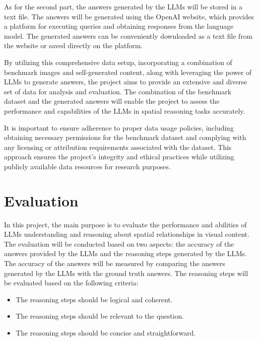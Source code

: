 \documentclass[journal,10pt]{IEEEtran}
\begin{document}
As for the second part, the answers generated by the LLMs will be stored in a text file. The answers will be generated using the OpenAI website, which provides a platform for executing queries and obtaining responses from the language model. The generated answers can be conveniently downloaded as a text file from the website or saved directly on the platform.

By utilizing this comprehensive data setup, incorporating a combination of benchmark images and self-generated content, along with leveraging the power of LLMs to generate answers, the project aims to provide an extensive and diverse set of data for analysis and evaluation. The combination of the benchmark dataset and the generated answers will enable the project to assess the performance and capabilities of the LLMs in spatial reasoning tasks accurately.

It is important to ensure adherence to proper data usage policies, including obtaining necessary permissions for the benchmark dataset and complying with any licensing or attribution requirements associated with the dataset. This approach ensures the project's integrity and ethical practices while utilizing publicly available data resources for research purposes.

\section{Evaluation}
In this project, the main purpose is to evaluate the performance and abilities of LLMs understanding and reasoning about spatial relationships in visual content. The evaluation will be conducted based on two aspects: the accuracy of the answers provided by the LLMs and the reasoning steps generated by the LLMs. The accuracy of the answers will be measured by comparing the answers generated by the LLMs with the ground truth answers. The reasoning steps will be evaluated based on the following criteria:
\begin{itemize}
    \item The reasoning steps should be logical and coherent.
    \item The reasoning steps should be relevant to the question.
    \item The reasoning steps should be concise and straightforward.
\end{itemize}
\end{document}
